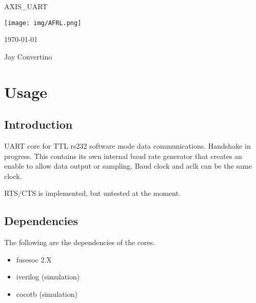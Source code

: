 \begin{titlepage}
  \begin{center}

  {\Huge AXIS\_UART}

  \vspace{25mm}

  \texttt{[image: img/AFRL.png]}

  \vspace{25mm}

  \today

  \vspace{15mm}

  {\Large Jay Convertino}

  \end{center}
\end{titlepage}

\tableofcontents

\newpage

\section{Usage}

\subsection{Introduction}

\par
UART core for TTL rs232 software mode data communications. Handshake in progress.
This contains its own internal baud rate generator that creates an enable to allow data output
or sampling. Baud clock and aclk can be the same clock.

RTS/CTS is implemented, but untested at the moment.

\subsection{Dependencies}

\par
The following are the dependencies of the cores.

\begin{itemize}
  \item fusesoc 2.X
  \item iverilog (simulation)
  \item cocotb (simulation)
\end{itemize}



